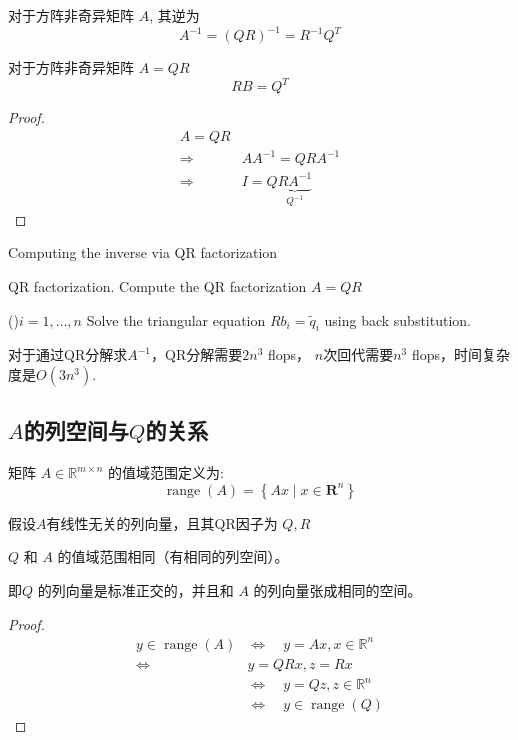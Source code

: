 \begin{corollary}
    对于方阵非奇异矩阵 ${A}$, 其逆为
$$
A^{-1}=(Q R)^{-1}=R^{-1} Q^{T}
$$
\end{corollary}

\begin{corollary}
    对于方阵非奇异矩阵 ${A} = QR$
    $$RB = Q^T$$
\end{corollary}

\begin{proof}
    $$\begin{aligned}
        A = QR\\
        \Rightarrow & A A^{-1} = QRA^{-1}\\
        \Rightarrow & I = Q\underbrace{RA^{-1} }_{Q^{-1}}
    \end{aligned}$$
\end{proof}

\begin{algorithm}[htbp]
    \caption{Computing the inverse via QR factorization}

    QR factorization. Compute the QR factorization $ A=Q R $\;

    \For(){$ i=1, \ldots, n $}{
        Solve the triangular equation $ R b_{i}=\tilde{q}_{i} $ using back substitution.
    }
\end{algorithm}

对于通过QR分解求$A^{-1}$，QR分解需要$2n^3$ flops， $n$次回代需要$n^3$ flops，时间复杂度是$O(3n^3)$.

\subsection{$A$的列空间与$Q$的关系}

矩阵 $A \in \mathbb{R}^{m \times n}$ 的值域范围定义为:
$$
\operatorname{range}(A)=\left\{A x \mid x \in \mathbf{R}^{n}\right\}
$$

\begin{theorem}
    假设$A$有线性无关的列向量，且其QR因子为 $Q, R$

    $Q$ 和 $A$ 的值域范围相同（有相同的列空间）。

\end{theorem}

即$Q$ 的列向量是标准正交的，并且和 $A$ 的列向量张成相同的空间。

\begin{proof}
    $$
\begin{aligned}
y \in \operatorname{range}(A) & \Leftrightarrow \quad y=A x, x \in \mathbb{R}^{n} \\
\Leftrightarrow & y=Q R x, z=R x \\
& \Leftrightarrow \quad y=Q z, z \in \mathbb{R}^{n} \\
& \Leftrightarrow \quad y \in \operatorname{range}(Q)
\end{aligned}
$$
\end{proof}

